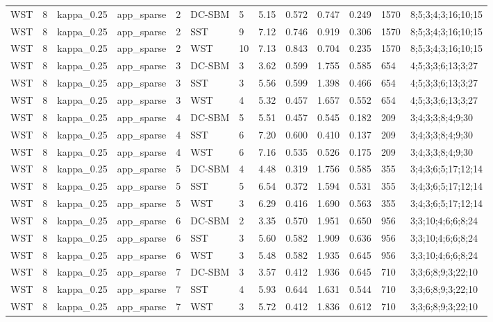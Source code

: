 \begin{table}[!h]
\begin{tabular}[t]{lllllllllllll}
WST & 8 & kappa_0.25 & app_sparse & 2 & DC-SBM & 5 & 5.15 & 0.572 & 0.747 & 0.249 & 1570 & 8;5;3;4;3;16;10;15\\
WST & 8 & kappa_0.25 & app_sparse & 2 & SST & 9 & 7.12 & 0.746 & 0.919 & 0.306 & 1570 & 8;5;3;4;3;16;10;15\\
WST & 8 & kappa_0.25 & app_sparse & 2 & WST & 10 & 7.13 & 0.843 & 0.704 & 0.235 & 1570 & 8;5;3;4;3;16;10;15\\
WST & 8 & kappa_0.25 & app_sparse & 3 & DC-SBM & 3 & 3.62 & 0.599 & 1.755 & 0.585 & 654 & 4;5;3;3;6;13;3;27\\
WST & 8 & kappa_0.25 & app_sparse & 3 & SST & 3 & 5.56 & 0.599 & 1.398 & 0.466 & 654 & 4;5;3;3;6;13;3;27\\
WST & 8 & kappa_0.25 & app_sparse & 3 & WST & 4 & 5.32 & 0.457 & 1.657 & 0.552 & 654 & 4;5;3;3;6;13;3;27\\
WST & 8 & kappa_0.25 & app_sparse & 4 & DC-SBM & 5 & 5.51 & 0.457 & 0.545 & 0.182 & 209 & 3;4;3;3;8;4;9;30\\
WST & 8 & kappa_0.25 & app_sparse & 4 & SST & 6 & 7.20 & 0.600 & 0.410 & 0.137 & 209 & 3;4;3;3;8;4;9;30\\
WST & 8 & kappa_0.25 & app_sparse & 4 & WST & 6 & 7.16 & 0.535 & 0.526 & 0.175 & 209 & 3;4;3;3;8;4;9;30\\
WST & 8 & kappa_0.25 & app_sparse & 5 & DC-SBM & 4 & 4.48 & 0.319 & 1.756 & 0.585 & 355 & 3;4;3;6;5;17;12;14\\
WST & 8 & kappa_0.25 & app_sparse & 5 & SST & 5 & 6.54 & 0.372 & 1.594 & 0.531 & 355 & 3;4;3;6;5;17;12;14\\
WST & 8 & kappa_0.25 & app_sparse & 5 & WST & 3 & 6.29 & 0.416 & 1.690 & 0.563 & 355 & 3;4;3;6;5;17;12;14\\
WST & 8 & kappa_0.25 & app_sparse & 6 & DC-SBM & 2 & 3.35 & 0.570 & 1.951 & 0.650 & 956 & 3;3;10;4;6;6;8;24\\
WST & 8 & kappa_0.25 & app_sparse & 6 & SST & 3 & 5.60 & 0.582 & 1.909 & 0.636 & 956 & 3;3;10;4;6;6;8;24\\
WST & 8 & kappa_0.25 & app_sparse & 6 & WST & 3 & 5.48 & 0.582 & 1.935 & 0.645 & 956 & 3;3;10;4;6;6;8;24\\
WST & 8 & kappa_0.25 & app_sparse & 7 & DC-SBM & 3 & 3.57 & 0.412 & 1.936 & 0.645 & 710 & 3;3;6;8;9;3;22;10\\
WST & 8 & kappa_0.25 & app_sparse & 7 & SST & 4 & 5.93 & 0.644 & 1.631 & 0.544 & 710 & 3;3;6;8;9;3;22;10\\
WST & 8 & kappa_0.25 & app_sparse & 7 & WST & 3 & 5.72 & 0.412 & 1.836 & 0.612 & 710 & 3;3;6;8;9;3;22;10\\

\end{tabular}
\end{table}
